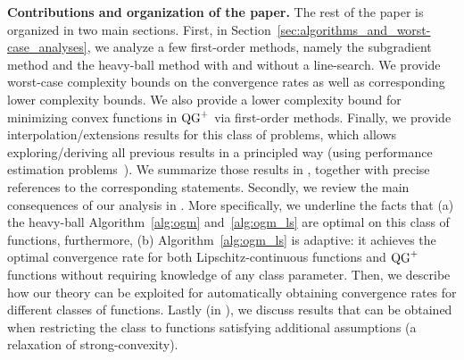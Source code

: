     \textbf{Contributions and organization of the paper.}
    The rest of the paper is organized in two main sections.
    First, in Section~\ref{sec:algorithms_and_worst-case_analyses}, we analyze a few first-order methods, namely the subgradient method and the heavy-ball method with and without a line-search.
    We provide worst-case complexity bounds on the convergence rates  as well as corresponding lower complexity bounds.
    We also provide a lower complexity bound for minimizing convex functions in $\operatorname{QG}^+$ via first-order methods.
    Finally, we provide {interpolation/extensions} results for this class of problems, which allows exploring/deriving all previous results in a principled way (using performance estimation problems~\cite{drori2014performance,taylor2017smooth}).
    We summarize those results in , together with precise references to the corresponding statements.
    Secondly, we review the main consequences of our analysis in .
    More specifically, we underline the facts that (a) the heavy-ball Algorithm~\ref{alg:ogm} and~\ref{alg:ogm_ls} are optimal on this class of functions, furthermore, (b) Algorithm~\ref{alg:ogm_ls} is  adaptive: it achieves the optimal convergence rate for both Lipschitz-continuous functions and $\operatorname{QG}^+$ functions without requiring knowledge of any class parameter.
    Then, we describe how our theory can be exploited for automatically obtaining convergence rates for different classes of functions.
    Lastly (in ), we discuss results that can be obtained when restricting the class to functions satisfying additional assumptions (a relaxation of strong-convexity).

